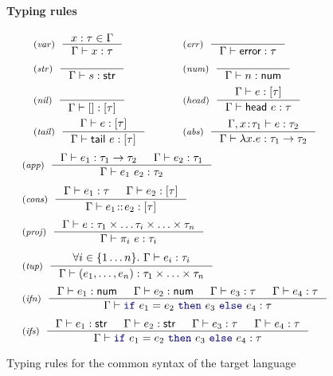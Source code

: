 \documentclass[
		twoside,openright,titlepage,numbers=noenddot,headinclude,%
                footinclude=true,cleardoublepage=empty,
                BCOR=10mm,paper=a4,fontsize=10pt, %
                ngerman,american, %
                ]{scrreprt}
\newcommand{\kvd}[1]{\textnormal{\textcolor{kvdclr}{\ttfamily #1}}}
\newcommand{\ident}[1]{\textnormal{\sffamily #1}}
\newcommand{\tyrule}[3]{ \inference[\footnotesize{(\emph{#1})}~~]{#2}{#3} }
\begin{document}
\begin{figure}[t]
\paragraph{Typing rules}
\begin{equation*}
\begin{array}{ll}
\tyrule{var}
  { x:\tau \in \Gamma }
  { \Gamma \vdash x:\tau }
&
\tyrule{err}
  { ~ }
  { \Gamma \vdash \ident{error}:\tau }
\\[1em]
\tyrule{str}
  { ~ }
  { \Gamma \vdash s:\ident{str} }
&
\tyrule{num}
  { ~ }
  { \Gamma \vdash n:\ident{num} }
\\[1em]
\tyrule{nil}
  { ~ }
  { \Gamma \vdash []:[\tau] }
&
\tyrule{head}
  { \Gamma \vdash e :[\tau] }
  { \Gamma \vdash \ident{head}~e:\tau }
\\[1em]
\tyrule{tail}
  { \Gamma \vdash e :[\tau] }
  { \Gamma \vdash \ident{tail}~e:[\tau] }
\qquad~&
\tyrule{abs}
  { \Gamma, x\!:\!\tau_1 \vdash e : \tau_2 }
  { \Gamma \vdash \lambda x.e : \tau_1 \rightarrow \tau_2 }
\end{array}
\end{equation*}
\begin{equation*}
\begin{array}{l}
\tyrule{app}
  { \Gamma \vdash e_1 : \tau_1 \rightarrow \tau_2  & \Gamma \vdash e_2 : \tau_1 }
  { \Gamma \vdash e_1~e_2 : \tau_2 }
\\[1.25em]
\tyrule{cons}
  { \Gamma \vdash e_1 :\tau & \Gamma \vdash e_2 : [\tau] }
  { \Gamma \vdash e_1\!::\!e_2 : [\tau] }
\\[1.25em]
\tyrule{proj}
  { \Gamma \vdash e : \tau_1 \times \ldots \tau_i \times \ldots \times \tau_n }
  { \Gamma \vdash \pi_i~e:\tau_i }
\\[1.25em]
\tyrule{tup}
  { \forall i\in\{1 \ldots n\}.~ \Gamma \vdash e_i : \tau_i }
  { \Gamma \vdash (e_1, \ldots, e_n) : \tau_1 \times \ldots \times \tau_n }
\\[1.25em]
\tyrule{ifn}
  { \Gamma \vdash e_1 : \ident{num} & \Gamma \vdash e_2 : \ident{num} &
    \Gamma \vdash e_3 : \tau & \Gamma \vdash e_4 : \tau}
  { \Gamma \vdash \kvd{if}~e_1 = e_2~\kvd{then}~e_3~\kvd{else}~e_4 : \tau}
\\[1.25em]
\tyrule{ifs}
  { \Gamma \vdash e_1 : \ident{str} & \Gamma \vdash e_2 : \ident{str} &
    \Gamma \vdash e_3 : \tau & \Gamma \vdash e_4 : \tau}
  { \Gamma \vdash \kvd{if}~e_1 = e_2~\kvd{then}~e_3~\kvd{else}~e_4 : \tau}
\end{array}
\end{equation*}

\caption{Typing rules for the common syntax of the target language}
\label{fig:transl-targetty}
\end{figure}
\end{document}
